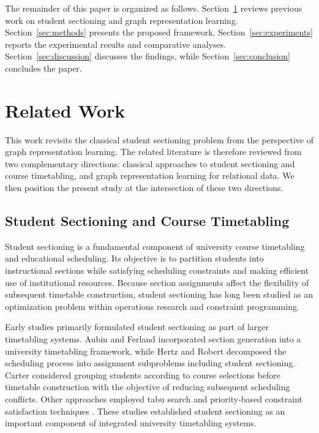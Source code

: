 \documentclass[pdflatex,sn-mathphys-num,iicol]{sn-jnl}%
\theoremstyle{thmstyleone}%
\theoremstyle{thmstyletwo}%
\theoremstyle{thmstylethree}%
\begin{document}
The remainder of this paper is organized as follows. Section~\ref{sec:related} reviews previous work on student sectioning and graph representation learning. Section~\ref{sec:methods} presents the proposed framework. Section~\ref{sec:experiments} reports the experimental results and comparative analyses. Section~\ref{sec:discussion} discusses the findings, while Section~\ref{sec:conclusion} concludes the paper.

\section{Related Work}
\label{sec:related}

This work revisits the classical student sectioning problem from the perspective of graph representation learning. The related literature is therefore reviewed from two complementary directions: classical approaches to student sectioning and course timetabling, and graph representation learning for relational data. We then position the present study at the intersection of these two directions.

\subsection{Student Sectioning and Course Timetabling}

Student sectioning is a fundamental component of university course timetabling and educational scheduling. Its objective is to partition students into instructional sections while satisfying scheduling constraints and making efficient use of institutional resources. Because section assignments affect the flexibility of subsequent timetable construction, student sectioning has long been studied as an optimization problem within operations research and constraint programming.

Early studies primarily formulated student sectioning as part of larger timetabling systems. Aubin and Ferland \cite{aubin1989large} incorporated section generation into a university timetabling framework, while Hertz and Robert \cite{hertz1998constructing} decomposed the scheduling process into assignment subproblems including student sectioning. Carter \cite{Carter2001Comprehensive} considered grouping students according to course selections before timetable construction with the objective of reducing subsequent scheduling conflicts. Other approaches employed tabu search \cite{Alvarez-Valdes2000} and priority-based constraint satisfaction techniques \cite{feldman1990optimization}. These studies established student sectioning as an important component of integrated university timetabling systems.
\end{document}
